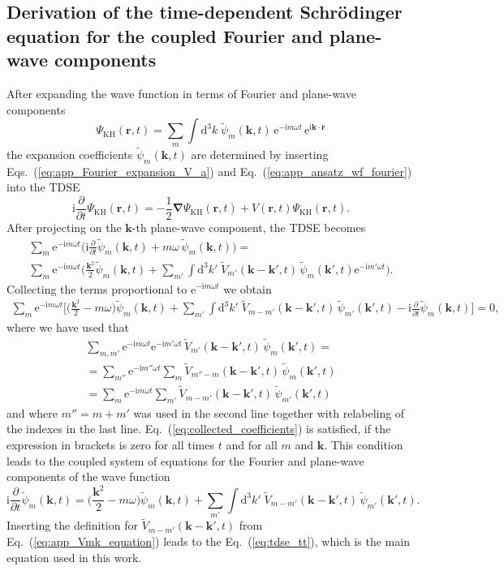 \documentclass[
pra%
,preprint%
,amssymb, nobibnotes, aps, superscriptaddress, floatfix]{revtex4}
\renewcommand{\imath}{\mathrm{i}}
\newcommand{\dd}{\mathrm{d}}
\newcommand{\rv}{\mathbf{r}}
\newcommand{\kv}{\mathbf{k}}
\newcommand{\khsub}{\mathrm{KH}}
\newcommand{\psit}{\widetilde{\psi}}
\newcommand{\Vt}{\widetilde{V}}
\newcommand{\intK}{\int \dd^3 k}
\newcommand{\Vidx}[1]{\Vt_{#1}}
\newcommand{\Vmkp}{\Vidx{m'}(\kv-\kv', t)} %
\newcommand{\Vmpkp}{\Vidx{m-m'}(\kv-\kv', t)}
\newcommand{\Pidx}[1]{\psit_{#1}}
\newcommand{\Pmk}{\Pidx{m}(\kv, t)} %
\newcommand{\Pmkp}{\Pidx{m}(\kv', t)}
\newcommand{\Pmpkp}{\Pidx{m'}(\kv', t)} %
\def\e#1{\mathrm{e}^{#1}}
\begin{document}
\subsection{Derivation of the time-dependent Schr\"{o}dinger equation for the coupled Fourier and plane-wave components}

After expanding the wave function in terms of Fourier and plane-wave components
\begin{equation}
\Psi_{\khsub}(\rv, t) = \sum_{m} \intK \; \Pmk \, \e{-\imath m \omega t} \, \e{\imath \kv \cdot \rv} \label{eq:app_ansatz_wf_fourier}
\end{equation}
the expansion coefficients $\Pmk$ are determined by inserting Eqs.~(\ref{eq:app_Fourier_expansion_V_a}) and Eq.~(\ref{eq:app_ansatz_wf_fourier}) into the TDSE
\begin{equation}
\imath \frac{\partial}{\partial t} \Psi_\khsub(\rv, t) = -\frac{1}{2} \boldsymbol{\nabla} \Psi_\khsub(\rv, t) + V(\rv, t) \Psi_\khsub(\rv, t).
\end{equation}
After projecting on the $\kv$-th plane-wave component, the TDSE becomes
\begin{multline}
\sum_m \e{-\imath m \omega t} \Big( \imath \frac{\partial}{\partial t} \Pmk +m \omega \, \Pmk \Big) = \\
\sum_m \e{-\imath m \omega t} \Big( \frac{\kv^2}{2} \Pmk + \sum_{m'} \intK' \; \Vmkp \, \Pmkp \e{-\imath m' \omega t} \Big).
\end{multline}
Collecting the terms proportional to $\e{-\imath m \omega t}$ we obtain
\begin{multline}
\sum_m \e{-\imath m \omega t} \Bigg[  \Big(\frac{\kv^2}{2} -m \omega \Big) \Pmk + \sum_{m'} \intK' \; \Vmpkp \, \Pmpkp - \imath \frac{\partial}{\partial t} \Pmk \Bigg] = 0, \label{eq:collected_coefficients}
\end{multline}
where we have used that
\begin{multline}
\sum_{m,m'} \e{-\imath m \omega t} \e{-\imath m' \omega t} \, \Vmkp \, \Pmkp = \\
= \sum_{m''} \e{-\imath m'' \omega t}  \sum_{m} \Vt_{m''-m}(\kv-\kv', t) \, \Pmkp \\
= \sum_{m} \e{-\imath m \omega t} \sum_{m'} \Vmpkp \, \Pmpkp
\end{multline}
and where $m'' = m+m'$ was used in the second line together with relabeling of the indexes in the last line.
Eq.~(\ref{eq:collected_coefficients}) is satisfied, if the expression in brackets is zero for all times $t$ and for all $m$ and $\kv$. This condition leads to the coupled system of equations for the Fourier and plane-wave components of the wave function
\begin{equation}
\imath \frac{\partial}{\partial t} \Pmk  = \Big(\frac{\kv^2}{2} -m \omega \Big) \Pmk + \sum_{m'} \intK' \; \Vmpkp \, \Pmpkp. \label{eq:tdse_Fourier_components}
\end{equation}
Inserting the definition for $\Vmpkp$ from Eq.~(\ref{eq:app_Vmk_equation}) leads to the Eq.~(\ref{eq:tdse_tt}), which is the main equation used in this work.
\end{document}
